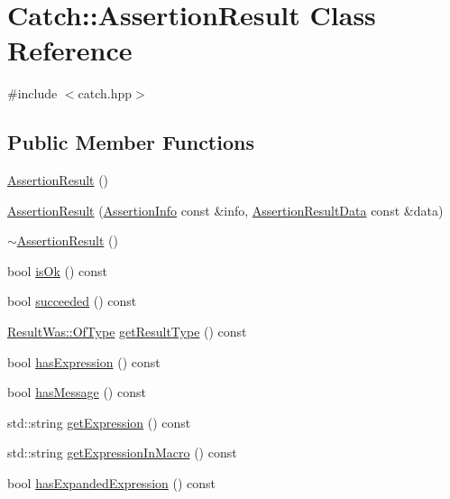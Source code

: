 \hypertarget{classCatch_1_1AssertionResult}{\section{Catch\-:\-:Assertion\-Result Class Reference}
\label{classCatch_1_1AssertionResult}
}


{\ttfamily \#include $<$catch.\-hpp$>$}

\subsection*{Public Member Functions}
\begin{DoxyCompactItemize}
\item 
\hyperlink{classCatch_1_1AssertionResult_a570b999c5f66e33cb31d3adb29fec25b}{Assertion\-Result} ()
\item 
\hyperlink{classCatch_1_1AssertionResult_ab58aeec27052ba400633ed0e36cea692}{Assertion\-Result} (\hyperlink{structCatch_1_1AssertionInfo}{Assertion\-Info} const \&info, \hyperlink{structCatch_1_1AssertionResultData}{Assertion\-Result\-Data} const \&data)
\item 
\hyperlink{classCatch_1_1AssertionResult_abf90f5abd04d38b2fb4f5d575bdc4f1e}{$\sim$\-Assertion\-Result} ()
\item 
bool \hyperlink{classCatch_1_1AssertionResult_a70fb6aa62a38db3bdcafb4bb134afb21}{is\-Ok} () const 
\item 
bool \hyperlink{classCatch_1_1AssertionResult_a5404062147930354afeb154de7cbaa7e}{succeeded} () const 
\item 
\hyperlink{structCatch_1_1ResultWas_a624e1ee3661fcf6094ceef1f654601ef}{Result\-Was\-::\-Of\-Type} \hyperlink{classCatch_1_1AssertionResult_aa90bec8064879a62fcdc8e1079bcdba1}{get\-Result\-Type} () const 
\item 
bool \hyperlink{classCatch_1_1AssertionResult_a45551f4f092c640ffce0cdd8a94f4b62}{has\-Expression} () const 
\item 
bool \hyperlink{classCatch_1_1AssertionResult_ab22a1c9baa182aeb2549fffeb8294d9e}{has\-Message} () const 
\item 
std\-::string \hyperlink{classCatch_1_1AssertionResult_a6105300b90d66b5c11b69813f83d074d}{get\-Expression} () const 
\item 
std\-::string \hyperlink{classCatch_1_1AssertionResult_ac368a7490af7669decd58efea7d7dc54}{get\-Expression\-In\-Macro} () const 
\item 
bool \hyperlink{classCatch_1_1AssertionResult_a122c369bd49430a304e3eaebdf184f36}{has\-Expanded\-Expression} () const 

\end{DoxyCompactItemize}
